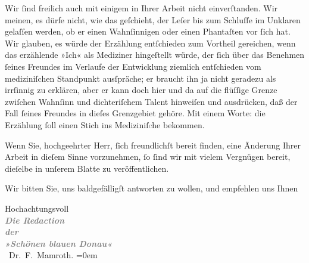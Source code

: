 \pstart
           Wir ſind freilich auch mit einigem in Ihrer Arbeit nicht {\pb}einverſtanden.
               Wir meinen, es dürfe nicht, wie das geſchieht, der Leſer bis zum Schluſſe im Unklaren
               gelaſſen werden, ob er einen Wahnſinnigen oder einen Phantaſten vor ſich hat. Wir
               glauben, es würde der Erzählung entſchieden zum Vortheil gereichen, wenn das erzählende »Ich« als
               Mediziner hingeſtellt würde, der ſich über das Benehmen ſeines Freundes im Verlaufe
               der Entwicklung ziemlich entſchieden vom mediziniſchen Standpunkt ausſpräche; er
               braucht ihn ja nicht geradezu als irrſinnig zu erklären, aber er kann doch hier und
               da auf die flüſſige Grenze zwiſchen Wahnſinn und dichteriſchem Talent hinweiſen und
               ausdrücken, daß {\pb}der Fall ſeines Freundes in dieſes
               Grenzgebiet gehöre. Mit einem Worte: die Erzählung ſoll einen Stich ins
                  Mediziniſ\textcolor{gray}{c}he bekommen.\pend
           
\pstart
           Wenn Sie, hochgeehrter Herr, ſich freundlichſt bereit finden, eine Änderung Ihrer Arbeit in dieſem Sinne
               vorzunehmen, ſo ſind wir mit vielem Vergnügen bereit, dieſelbe in unſerem Blatte zu veröffentlichen.\pend
           
\pstart
           Wir bitten Sie, uns baldgefälligſt antworten zu wollen, und empfehlen {\pb}uns Ihnen\pend
           
\pstart
           Hochachtungsvoll{\\[\baselineskip]}\textcolor{gray}{\textbf{\textit{Die Redaction}}}{\\[\baselineskip]}\textcolor{gray}{\textbf{\textit{der}}}{\\[\baselineskip]}\textcolor{gray}{\textbf{\textit{»Schönen blauen Donau«}}}{\\[\baselineskip]}\spacefill\mbox{\label{K_L02551-2v}\label{K_L02551-2} Dr. F. Mamroth.}\pend
           \leftskip=0em{}\endnumbering{}  
      